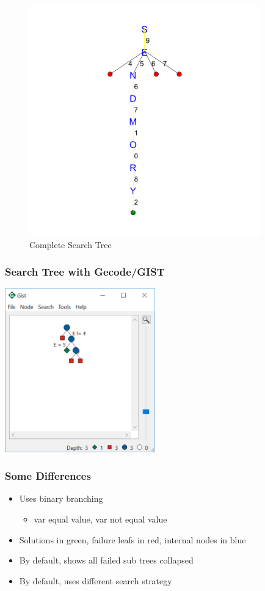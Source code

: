 \begin{figure}[ht]
\caption{\label{sendmore:First Solution} Complete Search Tree}
\begin{center}
\includegraphics[width=10cm]{../sendmore/FULL/tree_expanded}
\end{center}
\end{figure}

\begin{frame}
  \frametitle{Search Tree with Gecode/GIST}
  \includegraphics[width=6.5cm]{../sendmore/images/gisttree}
\end{frame}

\begin{frame}
  \frametitle{Some Differences}
  \begin{itemize}
  \item Uses binary branching 
  \begin{itemize}
  \item var equal value, var not equal value
  \end{itemize}
  \item Solutions in green, failure leafs in red, internal nodes in blue
  \item By default, shows all failed sub trees collapsed
  \item By default, uses different search strategy
  \end{itemize}
\end{frame}



